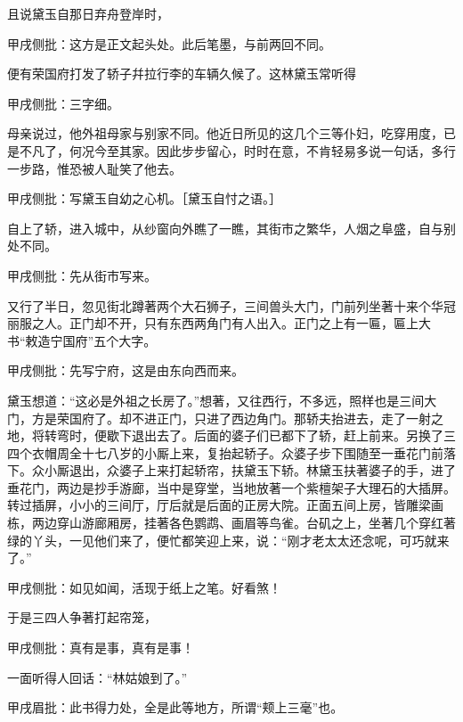 \begin{parag}
    且说黛玉自那日弃舟登岸时，\begin{note}甲戌侧批：这方是正文起头处。此后笔墨，与前两回不同。\end{note}便有荣国府打发了轿子幷拉行李的车辆久候了。这林黛玉常听得\begin{note}甲戌侧批：三字细。\end{note}母亲说过，他外祖母家与别家不同。他近日所见的这几个三等仆妇，吃穿用度，已是不凡了，何况今至其家。因此步步留心，时时在意，不肯轻易多说一句话，多行一步路，惟恐被人耻笑了他去。\begin{note}甲戌侧批：写黛玉自幼之心机。［黛玉自忖之语。］\end{note}自上了轿，进入城中，从纱窗向外瞧了一瞧，其街市之繁华，人烟之阜盛，自与别处不同。\begin{note}甲戌侧批：先从街市写来。\end{note}又行了半日，忽见街北蹲著两个大石狮子，三间兽头大门，门前列坐著十来个华冠丽服之人。正门却不开，只有东西两角门有人出入。正门之上有一匾，匾上大书“敕造宁国府”五个大字。\begin{note}甲戌侧批：先写宁府，这是由东向西而来。\end{note}黛玉想道：“这必是外祖之长房了。”想著，又往西行，不多远，照样也是三间大门，方是荣国府了。却不进正门，只进了西边角门。那轿夫抬进去，走了一射之地，将转弯时，便歇下退出去了。后面的婆子们已都下了轿，赶上前来。另换了三四个衣帽周全十七八岁的小厮上来，复抬起轿子。众婆子步下围随至一垂花门前落下。众小厮退出，众婆子上来打起轿帘，扶黛玉下轿。林黛玉扶著婆子的手，进了垂花门，两边是抄手游廊，当中是穿堂，当地放著一个紫檀架子大理石的大插屏。转过插屏，小小的三间厅，厅后就是后面的正房大院。正面五间上房，皆雕梁画栋，两边穿山游廊厢房，挂著各色鹦鹉、画眉等鸟雀。台矶之上，坐著几个穿红著绿的丫头，一见他们来了，便忙都笑迎上来，说：“刚才老太太还念呢，可巧就来了。”\begin{note}甲戌侧批：如见如闻，活现于纸上之笔。好看煞！\end{note}于是三四人争著打起帘笼，\begin{note}甲戌侧批：真有是事，真有是事！\end{note}一面听得人回话：“林姑娘到了。”\begin{note}甲戌眉批：此书得力处，全是此等地方，所谓“颊上三毫”也。\end{note}
\end{parag}


